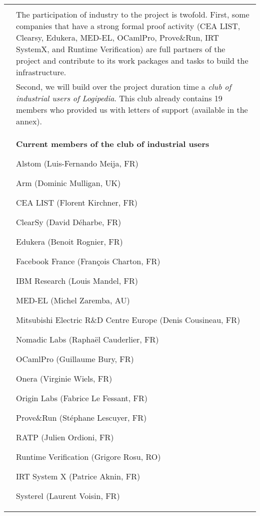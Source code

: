 \begin{longtable}{|p{}|p{}|}
&\\
&
\hspace{0.4cm}
The participation of industry to the project is twofold. First,
some companies that have a strong formal proof activity (CEA
LIST, Clearsy, Edukera, MED-EL, OCamlPro, Prove\&Run, IRT SystemX,
and Runtime Verification) are full partners of the project and
contribute to its work packages and tasks to build the
infrastructure.
\\
&
\hspace{0.4cm}
Second, we will build over the project duration time a {\em club of
  industrial users of Logipedia}. This club already contains
19 members who provided us with letters of support (available in the annex).
\\
&
\hspace{0.4cm}
\begin{framed}
\begin{center}
  {\bf \Large Current members of the club of industrial users}
\end{center}
\begin{compactitem}
\item Alstom (Luis-Fernando Meija, FR)
\item Arm (Dominic Mulligan, UK)
\item CEA LIST (Florent Kirchner, FR)
\item ClearSy (David Déharbe, FR)
\item Edukera (Benoit Rognier, FR)
\item Facebook France (François Charton, FR)
\item IBM Research (Louis Mandel, FR) 
\item MED-EL (Michel Zaremba, AU)
\item Mitsubishi Electric R\&D Centre Europe (Denis Cousineau, FR)
\item Nomadic Labs (Raphaël Cauderlier, FR)
\item OCamlPro (Guillaume Bury, FR)
\item Onera (Virginie Wiels, FR)
\item Origin Labs (Fabrice Le Fessant, FR)
\item Prove\&Run (Stéphane Lescuyer, FR)
\item RATP (Julien Ordioni, FR)
\item Runtime Verification (Grigore Rosu, RO)
\item IRT System X (Patrice Aknin, FR)
\item Systerel (Laurent Voisin, FR)

\end{compactitem}
\end{framed}
\end{longtable}
